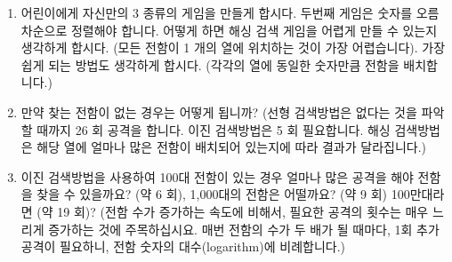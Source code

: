 \documentclass[]{article}
\begin{document}
\begin{enumerate}
\item
  어린이에게 자신만의 3 종류의 게임을 만들게 합시다. 두번째 게임은
  숫자를 오름차순으로 정렬해야 합니다. 어떻게 하면 해싱 검색 게임을
  어렵게 만들 수 있는지 생각하게 합시다. (모든 전함이 1 개의 열에
  위치하는 것이 가장 어렵습니다). 가장 쉽게 되는 방법도 생각하게 합시다.
  (각각의 열에 동일한 숫자만큼 전함을 배치합니다.)
\item
  만약 찾는 전함이 없는 경우는 어떻게 됩니까? (선형 검색방법은 없다는
  것을 파악할 때까지 26 회 공격을 합니다. 이진 검색방법은 5 회
  필요합니다. 해싱 검색방법은 해당 열에 얼마나 많은 전함이 배치되어
  있는지에 따라 결과가 달라집니다.)
\item
  이진 검색방법을 사용하여 100대 전함이 있는 경우 얼마나 많은 공격을
  해야 전함을 찾을 수 있을까요? (약 6 회), 1,000대의 전함은 어떨까요?
  (약 9 회) 100만대라면 (약 19 회)? (전함 수가 증가하는 속도에 비해서,
  필요한 공격의 횟수는 매우 느리게 증가하는 것에 주목하십시요. 매번
  전함의 수가 두 배가 될 때마다, 1회 추가 공격이 필요하니, 전함 숫자의
  대수(logarithm)에 비례합니다.)
\end{enumerate}
\end{document}

